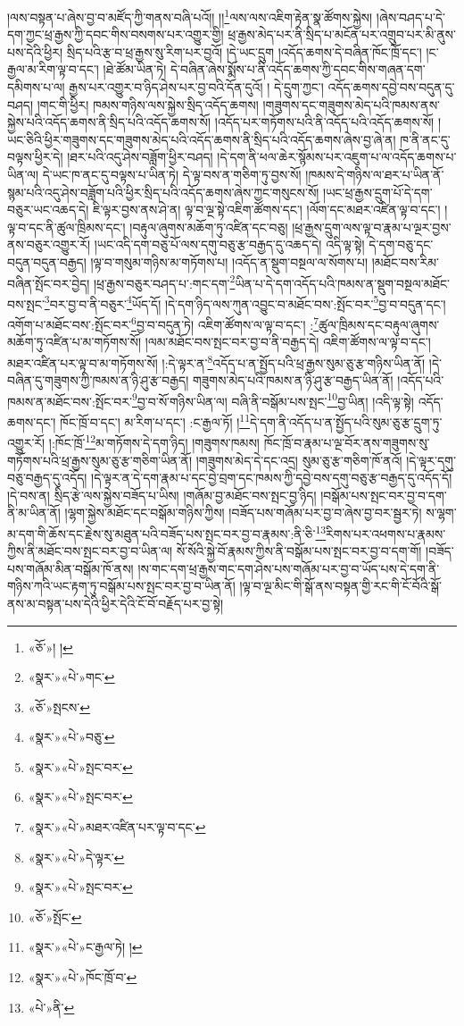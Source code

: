 །ལས་བསྟན་པ་ཞེས་བྱ་བ་མཛོད་ཀྱི་གནས་བཞི་པའོ།། །།\footnote{«ཅོ་»། །}ལས་ལས་འཇིག་རྟེན་སྣ་ཚོགས་སྐྱེས། །ཞེས་བཤད་པ་དེ་དག་ཀྱང་ཕྲ་རྒྱས་ཀྱི་དབང་གིས་བསགས་པར་འགྱུར་གྱི། ཕྲ་རྒྱས་མེད་པར་ནི་སྲིད་པ་མངོན་པར་འགྲུབ་པར་མི་ནུས་པས་དེའི་ཕྱིར། སྲིད་པའི་རྩ་བ་ཕྲ་རྒྱས་སུ་རིག་པར་བྱའོ། །དེ་ཡང་དྲུག །འདོད་ཆགས་དེ་བཞིན་ཁོང་ཁྲོ་དང་། །ང་རྒྱལ་མ་རིག་ལྟ་བ་དང་། །ཐེ་ཚོམ་ཡིན་ཏེ། དེ་བཞིན་ཞེས་སྨོས་པ་ནི་འདོད་ཆགས་ཀྱི་དབང་གིས་གཞན་དག་དམིགས་པ་ལ། རྒྱས་པར་འགྱུར་བ་ཉིད་ཤེས་པར་བྱ་བའི་དོན་དུའོ། །
དེ་དྲུག་ཀྱང་། འདོད་ཆགས་དབྱེ་བས་བདུན་དུ་བཤད། །གང་གི་ཕྱིར། ཁམས་གཉིས་ལས་སྐྱེས་སྲིད་འདོད་ཆགས། །གཟུགས་དང་གཟུགས་མེད་པའི་ཁམས་ནས་སྐྱེས་པའི་འདོད་ཆགས་ནི་སྲིད་པའི་འདོད་ཆགས་སོ། །འདོད་པར་གཏོགས་པའི་ནི་འདོད་པའི་འདོད་ཆགས་སོ། །ཡང་ཅིའི་ཕྱིར་གཟུགས་དང་གཟུགས་མེད་པའི་འདོད་ཆགས་ནི་སྲིད་པའི་འདོད་ཆགས་ཞེས་བྱ་ཞེ་ན། ཁ་ནི་ནང་དུ་བལྟས་ཕྱིར་དེ། །ཐར་པའི་འདུ་ཤེས་བཟློག་ཕྱིར་བཤད། །དེ་དག་ནི་ཕལ་ཆེར་སྙོམས་པར་འཇུག་པ་ལ་འདོད་ཆགས་པ་ཡིན་ལ། དེ་ཡང་ཁ་ནང་དུ་བལྟས་པ་ཡིན་ཏེ། དེ་ལྟ་བས་ན་གཅིག་ཏུ་བྱས་སོ། །ཁམས་དེ་གཉིས་ལ་ཐར་པ་ཡིན་ནོ་སྙམ་པའི་འདུ་ཤེས་བཟློག་པའི་ཕྱིར་སྲིད་པའི་འདོད་ཆགས་ཞེས་ཀྱང་གསུངས་སོ། །ཡང་ཕྲ་རྒྱས་དྲུག་པོ་དེ་དག་བཅུར་ཡང་འཆད་དེ། ཇི་ལྟར་བྱས་ནས་ཤེ་ན། ལྟ་བ་ལྔ་སྟེ་འཇིག་ཚོགས་དང་། །ལོག་དང་མཐར་འཛིན་ལྟ་བ་དང་། །ལྟ་བ་དང་ནི་ཚུལ་ཁྲིམས་དང་། །བརྟུལ་ཞུགས་མཆོག་ཏུ་འཛིན་དང་བཅུ། །ཕྲ་རྒྱས་དྲུག་ལས་ལྟ་བ་རྣམ་པ་ལྔར་བྱས་ནས་བཅུར་འགྱུར་རོ། །ཡང་འདི་དག་བཅུ་པོ་ལས་དགུ་བཅུ་རྩ་བརྒྱད་དུ་འཆད་དེ། འདི་ལྟ་སྟེ། དེ་དག་བཅུ་དང་བདུན་བདུན་བརྒྱད། །ལྟ་བ་གསུམ་གཉིས་མ་གཏོགས་པ། །འདོད་ན་སྡུག་བསྔལ་ལ་སོགས་པ། །མཐོང་བས་རིམ་བཞིན་སྤོང་བར་བྱེད། །ཕྲ་རྒྱས་བཅུར་བཤད་པ་:གང་དག་\footnote{«སྣར་»«པེ་»གང་}ཡིན་པ་དེ་དག་འདོད་པའི་ཁམས་ན་སྡུག་བསྔལ་མཐོང་བས་སྤང་\footnote{«ཅོ་»སྤངས་}བར་བྱ་བ་ནི་བཅུར་\footnote{«སྣར་»«པེ་»བཅུ་}ཡོད་དོ། །དེ་དག་ཉིད་ལས་ཀུན་འབྱུང་བ་མཐོང་བས་:སྤོང་བར་\footnote{«སྣར་»«པེ་»སྤང་བར་}བྱ་བ་བདུན་དང་། འགོག་པ་མཐོང་བས་:སྤོང་བར་\footnote{«སྣར་»«པེ་»སྤང་བར་}བྱ་བ་བདུན་ཏེ། འཇིག་ཚོགས་ལ་ལྟ་བ་དང་། :\footnote{«སྣར་»«པེ་»མཐར་འཛིན་པར་ལྟ་བ་དང་}ཚུལ་ཁྲིམས་དང་བརྟུལ་ཞུགས་མཆོག་ཏུ་འཛིན་པ་མ་གཏོགས་སོ། །ལམ་མཐོང་བས་སྤང་བར་བྱ་བ་ནི་བརྒྱད་དེ། འཇིག་ཚོགས་ལ་ལྟ་བ་དང་། མཐར་འཛིན་པར་ལྟ་བ་མ་གཏོགས་སོ། །:དེ་ལྟར་ན་\footnote{«སྣར་»«པེ་»དེ་ལྟར་}འདོད་པ་ན་སྤྱོད་པའི་ཕྲ་རྒྱས་སུམ་ཅུ་རྩ་གཉིས་ཡིན་ནོ། །དེ་བཞིན་དུ་གཟུགས་ཀྱི་ཁམས་ན་ཉི་ཤུ་རྩ་བརྒྱད། གཟུགས་མེད་པའི་ཁམས་ན་ཉི་ཤུ་རྩ་བརྒྱད་ཡིན་ནོ། །འདོད་པའི་ཁམས་ན་མཐོང་བས་:སྤོང་བར་\footnote{«སྣར་»«པེ་»སྤང་བར་}བྱ་བ་སོ་གཉིས་ཡིན་ལ། བཞི་ནི་བསྒོམ་པས་སྤང་\footnote{«ཅོ་»སྤོང་}བྱ་ཡིན། །འདི་ལྟ་སྟེ། འདོད་ཆགས་དང་། ཁོང་ཁྲོ་བ་དང་། མ་རིག་པ་དང་། :ང་རྒྱལ་ཏོ། །\footnote{«སྣར་»«པེ་»ང་རྒྱལ་ཏེ། །}དེ་དག་ནི་འདོད་པ་ན་སྤྱོད་པའི་སུམ་ཅུ་རྩ་དྲུག་ཏུ་འགྱུར་རོ། །:ཁོང་ཁྲོ་\footnote{«སྣར་»«པེ་»ཁོང་ཁྲོ་བ་}མ་གཏོགས་དེ་དག་ཉིད། །གཟུགས་ཁམས། ཁོང་ཁྲོ་བ་རྣམ་པ་ལྔ་བོར་ནས་གཟུགས་སུ་གཏོགས་པའི་ཕྲ་རྒྱས་སུམ་ཅུ་རྩ་གཅིག་ཡིན་ནོ། །གཟུགས་མེད་དེ་དང་འདྲ། སུམ་ཅུ་རྩ་གཅིག་ཁོ་ནའོ། །དེ་ལྟར་དགུ་བཅུ་བརྒྱད་དུ་འདོད། །དེ་ལྟར་ན་དེ་དག་རྣམ་པ་དང་བྱེ་བྲག་དང་ཁམས་ཀྱི་དབྱེ་བས་དགུ་བཅུ་རྩ་བརྒྱད་དུ་འདོད་དོ། །དེ་བས་ན། སྲིད་རྩེ་ལས་སྐྱེས་བཟོད་པ་ཡིས། །གཞོམ་བྱ་མཐོང་བས་སྤང་བྱ་ཉིད། །བསྒོམ་པས་སྤང་བར་བྱ་བ་དག་ནི་མ་ཡིན་ནོ། །ལྷག་སྐྱེས་མཐོང་དང་བསྒོམ་གཉིས་ཀྱིས། །བཟོད་པས་གཞོམ་པར་བྱ་བ་ཞེས་བྱ་བར་སྦྱར་ཏེ། ས་ལྷག་མ་དག་གི་ཆོས་དང་རྗེས་སུ་མཐུན་པའི་བཟོད་པས་སྤང་བར་བྱ་བ་རྣམས་:ནི་ཅི་\footnote{«པེ་»ནི་}རིགས་པར་འཕགས་པ་རྣམས་ཀྱིས་ནི་མཐོང་བས་སྤང་བར་བྱ་བ་ཡིན་ལ། སོ་སོའི་སྐྱེ་བོ་རྣམས་ཀྱིས་ནི་བསྒོམ་པས་སྤང་བར་བྱ་བ་དག་གོ། །བཟོད་པས་གཞོམ་མིན་བསྒོམ་ཁོ་ནས། །ས་གང་དག་ཕྲ་རྒྱས་གང་དག་ཤེས་པས་གཞོམ་པར་བྱ་བ་ཡོད་པས་དེ་དག་ནི་གཉིས་ཀའི་ཡང་རྟག་ཏུ་བསྒོམ་པས་སྤང་བར་བྱ་བ་ཡིན་ནོ། །ལྟ་བ་ལྔ་མིང་གི་སྒོ་ནས་བསྟན་གྱི་རང་གི་ངོ་བོའི་སྒོ་ནས་མ་བསྟན་པས་དེའི་ཕྱིར་དེའི་ངོ་བོ་བརྗོད་པར་བྱ་སྟེ། 